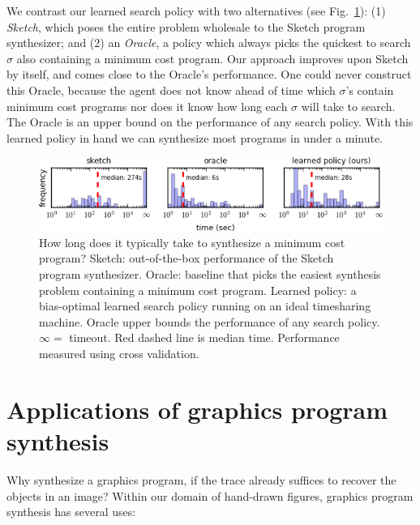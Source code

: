 \documentclass{article}
\newcommand{\remark}[1]{\textcolor{red}{[#1]}}
\begin{document}
We contrast our learned search policy
with two alternatives (see Fig.~\ref{policyEvaluation}):
(1) \emph{Sketch}, which poses the
entire problem wholesale to the Sketch program synthesizer;
and (2) an \emph{Oracle},
a policy which always picks the quickest to search $\sigma $
 also containing a minimum cost program.
Our approach improves upon Sketch by itself,
and comes close to the Oracle's performance.
One could never construct this Oracle,
because the agent does not know ahead of time which
$\sigma $'s contain minimum cost programs nor does it know how long each
$\sigma $ will take to search.
The Oracle is an upper bound on the performance of any search policy.
With this learned policy in hand we can synthesize most programs in under a minute.
\begin{figure}[h]
  \centering  \includegraphics[width = 14cm]{figures/policyComparison.png}
  \caption{How long does it typically take to synthesize a minimum cost program? Sketch: out-of-the-box performance of the Sketch~\cite{solar2008program} program synthesizer. Oracle: baseline that picks the easiest synthesis problem containing a minimum cost program. Learned policy: a bias-optimal learned search policy running on an ideal timesharing machine. Oracle  upper bounds  the performance of any search policy. $\infty = $ timeout. Red dashed line is median time. Performance measured using cross validation.}\label{policyEvaluation}
\end{figure} 







\section{Applications of graphics program synthesis}\label{applicationsSection}
Why synthesize a graphics program,
if the trace already suffices to recover the objects in an image?
Within our domain of hand-drawn figures, graphics program synthesis has several uses:
\end{document}
